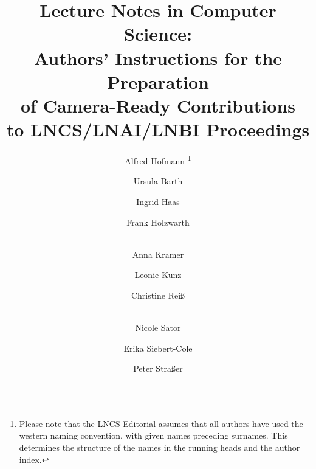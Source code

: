 \documentclass{book}
\begin{document}
\mainmatter  %

\title{Lecture Notes in Computer Science:\\Authors' Instructions
for the Preparation\\of Camera-Ready
Contributions\\to LNCS/LNAI/LNBI Proceedings}


%
%
\author{Alfred Hofmann%
\thanks{Please note that the LNCS Editorial assumes that all authors have used
the western naming convention, with given names preceding surnames. This determines
the structure of the names in the running heads and the author index.}%
\and Ursula Barth\and Ingrid Haas\and Frank Holzwarth\and\\
Anna Kramer\and Leonie Kunz\and Christine Rei\ss\and\\
Nicole Sator\and Erika Siebert-Cole\and Peter Stra\ss er}
%


%
%

\maketitle
\end{document}
